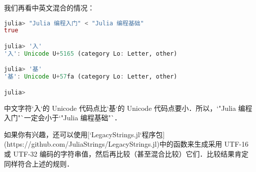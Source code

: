 我们再看中英文混合的情况：
\begin{lstlisting}[language=julia]
julia> "Julia 编程入门" < "Julia 编程基础"
true

julia> '入'
'入': Unicode U+5165 (category Lo: Letter, other)

julia> '基'
'基': Unicode U+57fa (category Lo: Letter, other)

julia> 
\end{lstlisting}

中文字符`入`的 Unicode 代码点比`基`的 Unicode 代码点要小．所以，`"Julia 编程入门"`一定会小于`"Julia 编程基础"`．

如果你有兴趣，还可以使用[`LegacyStrings.jl`程序包](https://github.com/JuliaStrings/LegacyStrings.jl)中的函数来生成采用 UTF-16 或 UTF-32 编码的字符串值，然后再比较（甚至混合比较）它们．比较结果肯定同样符合上述的规则．
